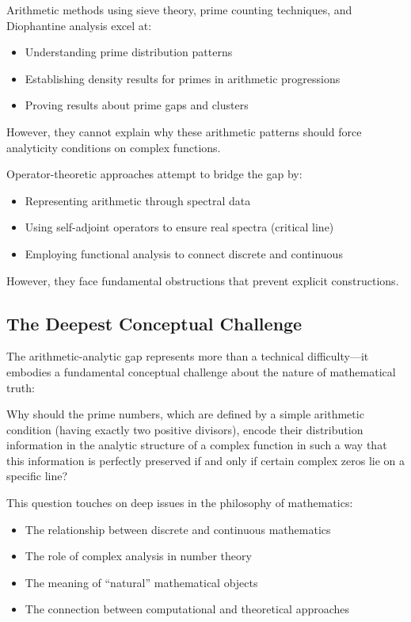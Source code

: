 \begin{example}
Arithmetic methods using sieve theory, prime counting techniques, and Diophantine analysis excel at:
\begin{itemize}
\item Understanding prime distribution patterns
\item Establishing density results for primes in arithmetic progressions
\item Proving results about prime gaps and clusters
\end{itemize}
However, they cannot explain why these arithmetic patterns should force analyticity conditions on complex functions.
\end{example}

\begin{example}
Operator-theoretic approaches attempt to bridge the gap by:
\begin{itemize}
\item Representing arithmetic through spectral data
\item Using self-adjoint operators to ensure real spectra (critical line)
\item Employing functional analysis to connect discrete and continuous
\end{itemize}
However, they face fundamental obstructions that prevent explicit constructions.
\end{example}

\subsection{The Deepest Conceptual Challenge}
\label{subsec:deepest_challenge}

The arithmetic-analytic gap represents more than a technical difficulty—it embodies a fundamental conceptual challenge about the nature of mathematical truth:

\begin{question}
Why should the prime numbers, which are defined by a simple arithmetic condition (having exactly two positive divisors), encode their distribution information in the analytic structure of a complex function in such a way that this information is perfectly preserved if and only if certain complex zeros lie on a specific line?
\end{question}

This question touches on deep issues in the philosophy of mathematics:
\begin{itemize}
\item The relationship between discrete and continuous mathematics
\item The role of complex analysis in number theory  
\item The meaning of ``natural'' mathematical objects
\item The connection between computational and theoretical approaches
\end{itemize}

